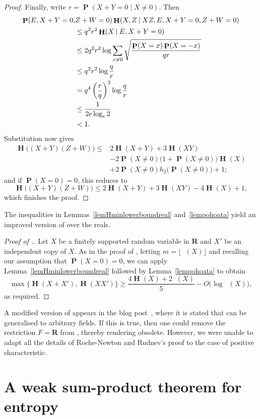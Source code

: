 \documentclass[twoside, 10pt]{article}
\DeclareMathOperator{\Eta}{\mathbf{H}}
\DeclareMathOperator{\Etamin}{\mathbf{H}_\infty}
\DeclareMathOperator{\pr}{\mathbf{P}}
\newcommand\given{\mathbin{|}}
\newcommand{\RR}{\mathbf{R}}   %
\begin{document}
\begin{proof}
Finally, write
$r=\pr(X+Y=0\given X\ne0)$.
Then
\begin{align*}
\pr(E,X+Y=0,&Z+W=0)
\Eta(X,Z\given XZ,E,X+Y=0,Z+W=0)\\
&\le q^2r^2\Eta(X\given E,X+Y=0)\\
&\le
2q^2r^2\log
\sum_{x\ne0}
\sqrt{\frac{\pr(X=x)\pr(X=-x)}{qr}}\\
&\le
q^2r^2\log\frac{q}{r}\\
&=
q^4\left(\frac rq\right)^2
\log\frac q r\\
&\le
\frac{1}{2e\log_e2} \cr
&< 1.
\end{align*}
Substitution now gives
\begin{align*}
\Eta\bigl((X+Y)(Z+W)\bigr)
\le{}&
2\Eta(X+Y)+3\Eta(XY)\\
&-2\pr(X\ne0)\bigl(1+\pr(X\ne0)\bigr)\Eta(X)\\
&+2\pr(X\ne0)h_2\bigl(\pr(X\ne0)\bigr)+1;
\end{align*}
and if $\pr(X=0)=0$, this reduces to
\[
\Eta\bigl((X+Y)(Z+W)\bigr)
\le
2\Eta(X+Y)+3\Eta(XY)-4\Eta(X)+1,
\]
which finishes the proof.
\end{proof}

The inequalities 
in Lemmas~\ref{lemHminlowerboundreal}
and~\ref{lempohoata}
yield an improved version of  over the reals.

\begin{proof}[Proof of .]
Let $X$ be a finitely supported random variable in $\RR$ and
$X'$ be an independent copy of $X$. 
As in the proof of , letting $m=\lfloor 
\Etamin(X)\rfloor$ and 
recalling our assumption that $\pr(X=0) = 0$, we can 
apply
Lemma~\ref{lemHminlowerboundreal} followed by Lemma~\ref{lempohoata}
to obtain
$$\max\bigl\{ \Eta(X+X'), \Eta(XX')\bigr\}
\ge \frac{4\Eta(X) + 2\Etamin(X)}{5} - O\bigl(\log\Etamin(X)\bigr),$$
as required.
\end{proof}

A modified version of  appears in the 
blog post~\cite{pohoata2026}, where  it is stated that  can be generalised to arbitrary fields. If this is true, then one could remove the restriction $F=\RR$ from , thereby rendering  obsolete. However, we were unable to adapt all the details of Roche-Newton and Rudnev's proof to the case of positive characteristic.


\section{A weak sum-product theorem for entropy}
\end{document}
